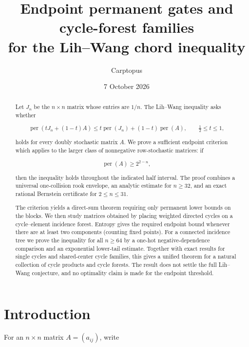 \documentclass[11pt]{article}
\title{Endpoint permanent gates and cycle-forest families\\
for the Lih--Wang chord inequality}
\author{Carptopus}
\date{7 October 2026}
\begin{document}
\maketitle
\begin{center}
\end{center}

\begin{abstract}


Let $J_n$ be the $n\times n$ matrix whose entries are $1/n$.  The Lih--Wang
inequality asks whether

\[
\operatorname{per}(tJ_n+(1-t)A)
\le t\operatorname{per}(J_n)+(1-t)\operatorname{per}(A),
\qquad \tfrac12\le t\le1,
\]

holds for every doubly stochastic matrix $A$.  We prove a sufficient endpoint
criterion which applies to the larger class of nonnegative row-stochastic matrices:
if

\[
\operatorname{per}(A)\ge 2^{2-n},
\]

then the inequality holds throughout the indicated half interval.  The proof combines
a universal one-collision rook envelope, an analytic estimate for $n\ge32$, and an
exact rational Bernstein certificate for $2\le n\le31$.

The criterion yields a direct-sum theorem requiring only permanent lower bounds on
the blocks.  We then study matrices obtained by placing weighted directed cycles on a
cycle--element incidence forest.  Entropy gives the required endpoint bound whenever
there are at least two components (counting fixed points).  For a connected incidence
tree we prove the inequality for all $n\ge64$ by a one-hot negative-dependence
comparison and an exponential lower-tail estimate.  Together with exact results for
single cycles and shared-center cycle families, this gives a unified theorem for a
natural collection of cycle products and cycle forests.  The result does not settle
the full Lih--Wang conjecture, and no optimality claim is made for the endpoint
threshold.

\end{abstract}

\section{Introduction}


For an $n\times n$ matrix $A=(a_{ij})$, write
\end{document}
